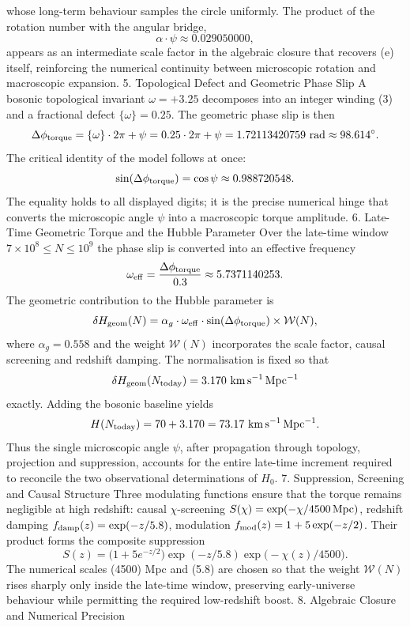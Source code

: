 whose long-term behaviour samples the circle uniformly. The product of the rotation number with the angular bridge,
\[
\alpha\cdot\psi\approx 0.029050000,
\]
appears as an intermediate scale factor in the algebraic closure that recovers (e) itself, reinforcing the numerical continuity between microscopic rotation and macroscopic expansion.
5. Topological Defect and Geometric Phase Slip
A bosonic topological invariant \(\omega=+3.25\) decomposes into an integer winding (3) and a fractional defect \(\{\omega\}=0.25\). The geometric phase slip is then
\[
\Delta\phi_{\rm torque}=\{\omega\}\cdot 2\pi+\psi=0.25\cdot 2\pi+\psi=1.72113420759\ {\rm rad}\approx 98.614^\circ.
\]
The critical identity of the model follows at once:
\[
\sin(\Delta\phi_{\rm torque})=\cos\psi\approx 0.988720548.
\]
The equality holds to all displayed digits; it is the precise numerical hinge that converts the microscopic angle \(\psi\) into a macroscopic torque amplitude.
6. Late-Time Geometric Torque and the Hubble Parameter
Over the late-time window \(7\times 10^{8}\le N\le 10^{9}\) the phase slip is converted into an effective frequency
\[
\omega_{\rm eff}=\frac{\Delta\phi_{\rm torque}}{0.3}\approx 5.7371140253.
\]
The geometric contribution to the Hubble parameter is
\[
\delta H_{\rm geom}(N)=\alpha_{g}\cdot\omega_{\rm eff}\cdot\sin(\Delta\phi_{\rm torque})\times\mathcal{W}(N),
\]
where \(\alpha_{g}=0.558\) and the weight \(\mathcal{W}(N)\) incorporates the scale factor, causal screening and redshift damping. The normalisation is fixed so that
\[
\delta H_{\rm geom}(N_{\rm today})=3.170\ {\rm km\,s^{-1}\,Mpc^{-1}}
\]
exactly. Adding the bosonic baseline yields
\[
H(N_{\rm today})=70+3.170=73.17\ {\rm km\,s^{-1}\,Mpc^{-1}}.
\]
Thus the single microscopic angle \(\psi\), after propagation through topology, projection and suppression, accounts for the entire late-time increment required to reconcile the two observational determinations of \(H_{0}\).
7. Suppression, Screening and Causal Structure
Three modulating functions ensure that the torque remains negligible at high redshift:
causal \(\chi\)-screening \(S(\chi)=\exp(-\chi/4500\,{\rm Mpc})\),
redshift damping \(f_{\rm damp}(z)=\exp(-z/5.8)\),
modulation \(f_{\rm mod}(z)=1+5\exp(-z/2)\).
Their product forms the composite suppression
\[
S(z)=\bigl(1+5e^{-z/2}\bigr)\exp(-z/5.8)\exp\bigl(-\chi(z)/4500\bigr).
\]
The numerical scales (4500) Mpc and (5.8) are chosen so that the weight \(\mathcal{W}(N)\) rises sharply only inside the late-time window, preserving early-universe behaviour while permitting the required low-redshift boost.
8. Algebraic Closure and Numerical Precision
